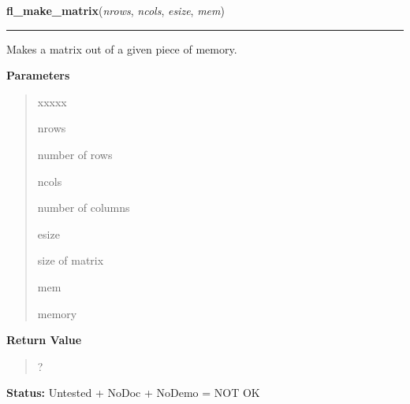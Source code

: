     \vspace{0.5ex}

\hspace{.8\funcindent}\begin{boxedminipage}{\funcwidth}

    \raggedright \textbf{fl\_make\_matrix}(\textit{nrows}, \textit{ncols}, \textit{esize}, \textit{mem})

    \vspace{-1.5ex}

    \rule{\textwidth}{0.5\fboxrule}
\setlength{\parskip}{2ex}
    Makes a matrix out of a given piece of memory.

\setlength{\parskip}{1ex}
      \textbf{Parameters}
      \vspace{-1ex}

      \begin{quote}
        \begin{Ventry}{xxxxx}

          \item[nrows]

          number of rows

          \item[ncols]

          number of columns

          \item[esize]

          size of matrix

          \item[mem]

          memory

        \end{Ventry}

      \end{quote}

      \textbf{Return Value}
    \vspace{-1ex}

      \begin{quote}
      ?

      \end{quote}

\textbf{Status:} Untested + NoDoc + NoDemo = NOT OK



    \end{boxedminipage}

    \label{xformslib:flflimage:fl_free_matrix}

